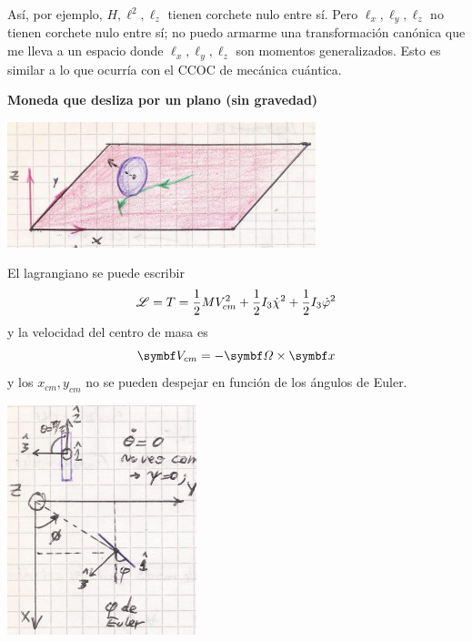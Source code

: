 \documentclass[10pt,oneside]{CBFT_book}
\begin{document}
Así, por ejemplo, $H,\ell^2, \ell_z$ tienen corchete nulo entre sí. Pero $\ell_x, \ell_y, \ell_z$ no tienen corchete nulo
entre sí; no puedo armarme una transformación canónica que me lleva a un espacio donde $\ell_x, \ell_y, \ell_z$ son
momentos generalizados.
Esto es similar a lo que ocurría con el CCOC de mecánica cuántica.


\begin{ejemplo}{\bf Moneda que desliza por un plano (sin gravedad)}


\includegraphics[scale=0.4]{images/fig_mc_moneda_dos_1.jpg}

El lagrangiano se puede escribir
\[
	\mathscr{L} = T = \frac 1 2 M V_{cm}^2 + \frac 1 2 I_3 \dot{\chi}^2 + \frac 1 2 I_3 \dot{\varphi}^2
\]
y la velocidad del centro de masa es
\[
	\vb{V}_{cm} = - \vb{\Omega} \times \vb{x}
\]
y los $x_{cm}, y_{cm}$ no se pueden despejar en función de los ángulos de Euler.

\includegraphics[scale=0.4]{images/fig_mc_moneda_dos_2.jpg}

\end{ejemplo}





\end{document}

